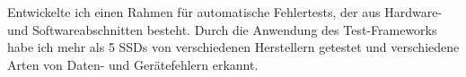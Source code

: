 \documentclass[../main.tex]{subfiles}
\begin{document}
\begin{category}
{\begin{itemize}
       Entwickelte ich einen Rahmen für automatische Fehlertests, 
       der aus Hardware- und Softwareabschnitten besteht. 
       Durch die Anwendung des Test-Frameworks habe ich mehr 
       als 5 SSDs von verschiedenen Herstellern getestet und 
       verschiedene Arten von Daten- und Gerätefehlern erkannt.

    \end{itemize}
  }
\end{category}
\end{document}
